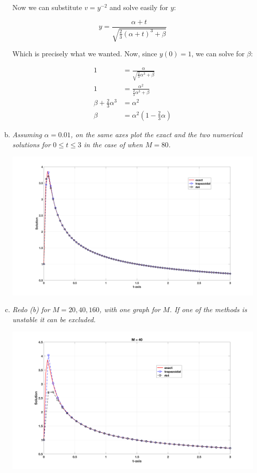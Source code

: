 \documentclass{article}
\begin{document}
\begin{enumerate}[(a)]
    Now we can substitute $v = y^{-2}$ and solve easily for $y$:

    $$y = \frac{\alpha + t}{\sqrt{\frac{2}{3}(\alpha + t)^3 + \beta}}$$

    Which is precisely what we wanted. Now, since $y(0) = 1$, we can solve for $\beta$:

    \begin{align*}
      1 &= \frac{\alpha}{\sqrt{\frac{2}{3}\alpha^3 + \beta}} \\
      1 &= \frac{\alpha^2}{\frac{2}{3}\alpha^3 + \beta} \\
      \beta + \frac{2}{3}\alpha^3 &= \alpha^2 \\
      \beta &= \alpha^2(1 - \frac{2}{3}\alpha)
    \end{align*}

  \item \textit{Assuming $\alpha = 0.01$, on the same axes plot the exact and the two numerical solutions for $0 \leq t \leq 3$ in the case of when $M=80$.}

    \includegraphics[width=\textwidth]{b.png}

  \item \textit{Redo (b) for $M=20,40,160$, with one graph for $M$. If one of the methods is unstable it can be excluded.}

    \includegraphics[width=\textwidth]{c40.png}


\end{enumerate}
\end{document}
